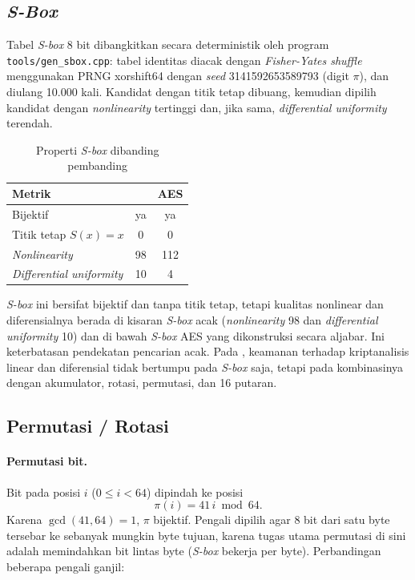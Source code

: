 \subsection{\textit{S-Box}}
Tabel \textit{S-box} 8 bit dibangkitkan secara deterministik oleh program
\texttt{tools/gen\_sbox.cpp}: tabel identitas diacak dengan \textit{Fisher-Yates shuffle}
menggunakan PRNG xorshift64 dengan \textit{seed} 3141592653589793 (digit $\pi$), dan diulang
10.000 kali. Kandidat dengan titik tetap dibuang, kemudian dipilih kandidat dengan
\textit{nonlinearity} tertinggi dan, jika sama, \textit{differential uniformity} terendah.

\begin{table}[H]
  \centering
  \caption{Properti \textit{S-box} \algname{} dibanding pembanding}
  \begin{tabular}{lcc}
    \toprule
    Metrik & \algname{} & AES \\
    \midrule
    Bijektif & ya & ya \\
    Titik tetap $S(x) = x$ & 0 & 0 \\
    \textit{Nonlinearity} & 98 & 112 \\
    \textit{Differential uniformity} & 10 & 4 \\
    \bottomrule
  \end{tabular}
\end{table}

\textit{S-box} ini bersifat bijektif dan tanpa titik tetap, tetapi kualitas nonlinear dan
diferensialnya berada di kisaran \textit{S-box} acak (\textit{nonlinearity} 98 dan
\textit{differential uniformity} 10) dan di bawah \textit{S-box} AES yang dikonstruksi secara
aljabar. Ini keterbatasan pendekatan pencarian acak. Pada \algname{}, keamanan terhadap
kriptanalisis linear dan diferensial tidak bertumpu pada \textit{S-box} saja, tetapi pada
kombinasinya dengan akumulator, rotasi, permutasi, dan 16 putaran.

\subsection{Permutasi / Rotasi}\label{sec:perm}
\paragraph{Permutasi bit.} Bit pada posisi $i$ ($0 \le i < 64$) dipindah ke posisi
\begin{equation}
  \pi(i) = 41\,i \bmod 64.
\end{equation}
Karena $\gcd(41, 64) = 1$, $\pi$ bijektif. Pengali dipilih agar 8 bit dari satu byte tersebar ke
sebanyak mungkin byte tujuan, karena tugas utama permutasi di sini adalah memindahkan bit lintas
byte (\textit{S-box} bekerja per byte). Perbandingan beberapa pengali ganjil:

